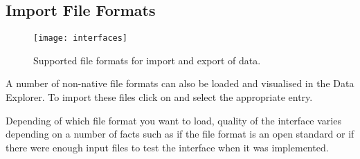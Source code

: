 \subsection{Import File Formats}

\begin{figure}[tb]
\begin{center}
\texttt{[image: interfaces]}
\caption{Supported file formats for import and export of data.}
\label{fig:interfaces}
\end{center}
\end{figure}

A number of non-native file formats can also be loaded and visualised in the Data Explorer. To import these files click on  and select the appropriate entry.

Depending of which file format you want to load, quality of the interface varies depending on a number of facts such as if the file format is an open standard or if there were enough input files to test the interface when it was implemented.

